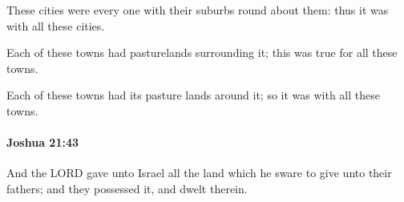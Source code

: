 			\begin{versebox}
					\item[BHS] 
					\item[ASV] These cities were every one with their suburbs round about them: thus it was with all these cities.
					\item[NIV] Each of these towns had pasturelands surrounding it; this was true for all these towns.
					\item[NRSV] Each of these towns had its pasture lands around it; so it was with all these towns.
			\end{versebox}

		\paragraph{Joshua 21:43} %
			\label{JOSHUA-21-43}

			And the LORD gave unto Israel all the land which he sware to give unto their fathers; and they possessed it, and dwelt therein.

